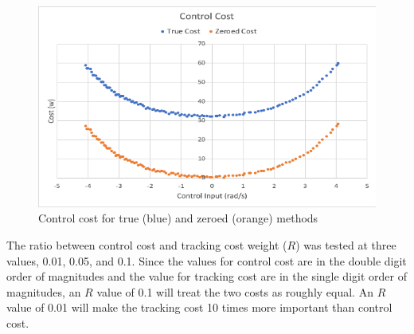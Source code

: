 \begin{figure}[ht]
    \centerline{\includegraphics[width=\linewidth]{img/cost.png}}
    \caption[Control Cost]{Control cost for true (blue) and zeroed (orange) methods}
    \label{fig:cost}
\end{figure}

The ratio between control cost and tracking cost weight ($R$) was tested at three values, 0.01, 0.05, and 0.1. Since the values for control cost are in the double digit order of magnitudes and the value for tracking cost are in the single digit order of magnitudes, an $R$ value of 0.1 will treat the two costs as roughly equal. An $R$ value of 0.01 will make the tracking cost 10 times more important than control cost. 

